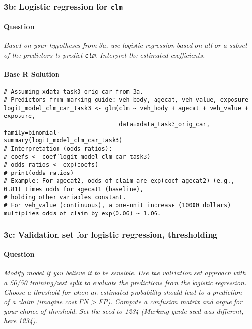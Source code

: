 \documentclass[12pt,a4paper]{article}
\newcommand{\Rcode}[1]{\texttt{#1}} %
\begin{document}
    \subsubsection{3b: Logistic regression for \Rcode{clm}}
        \paragraph{Question}
        \textit{Based on your hypotheses from 3a, use logistic regression based on all or a subset of the predictors to predict \Rcode{clm}. Interpret the estimated coefficients.}
        \paragraph{Base R Solution}
\begin{lstlisting}[]
# Assuming xdata_task3_orig_car from 3a.
# Predictors from marking guide: veh_body, agecat, veh_value, exposure
logit_model_clm_car_task3 <- glm(clm ~ veh_body + agecat + veh_value + exposure, 
                                 data=xdata_task3_orig_car, family=binomial)
summary(logit_model_clm_car_task3)
# Interpretation (odds ratios):
# coefs <- coef(logit_model_clm_car_task3)
# odds_ratios <- exp(coefs)
# print(odds_ratios)
# Example: For agecat2, odds of claim are exp(coef_agecat2) (e.g., 0.81) times odds for agecat1 (baseline),
# holding other variables constant.
# For veh_value (continuous), a one-unit increase (10000 dollars) multiplies odds of claim by exp(0.06) ~ 1.06.
\end{lstlisting}

    \subsubsection{3c: Validation set for logistic regression, thresholding}
        \paragraph{Question}
        \textit{Modify model if you believe it to be sensible. Use the validation set approach with a 50/50 training/test split to evaluate the predictions from the logistic regression. Choose a threshold for when an estimated probability should lead to a prediction of a claim (imagine cost FN > FP). Compute a confusion matrix and argue for your choice of threshold. Set the seed to 1234 (Marking guide seed was different, here 1234).}
\end{document}

